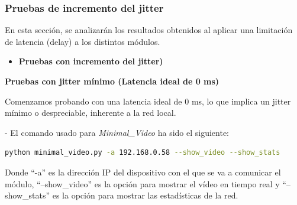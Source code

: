 \subsubsection{Pruebas de incremento del jitter}

En esta sección, se analizarán los resultados obtenidos al aplicar una limitación de latencia (delay) a los distintos módulos.

\begin{itemize}
    \item \textbf{Pruebas con incremento del jitter)}
\end{itemize}

\textbf{Pruebas con jitter mínimo (Latencia ideal de 0 ms)}
\vspace{\baselineskip}

Comenzamos probando con una latencia ideal de 0 ms, lo que implica un jitter mínimo o despreciable, inherente a la red local.

- El comando usado para \textit{Minimal\_Video} ha sido el siguiente:
\vspace{\baselineskip}

\begin{lstlisting}[language=bash]
python minimal_video.py -a 192.168.0.58 --show_video --show_stats
\end{lstlisting}
Donde ``-a'' es la dirección IP del dispositivo con el que se va a comunicar el módulo, ``--show\_video'' es la opción para mostrar el vídeo en tiempo real y ``--show\_stats'' es la opción para mostrar las estadísticas de la red.
\vspace{\baselineskip}

